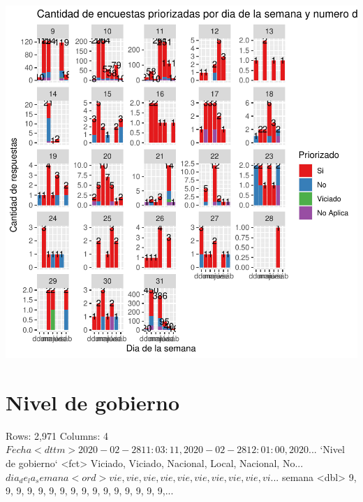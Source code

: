 \documentclass{article}
\begin{document}
\includegraphics{seguimientov5-030}


\section{Nivel de gobierno}

\begin{Schunk}
\begin{Soutput}
Rows: 2,971
Columns: 4
$ Fecha               <dttm> 2020-02-28 11:03:11, 2020-02-28 12:01:00, 2020...
$ `Nivel de gobierno` <fct> Viciado, Viciado, Nacional, Local, Nacional, No...
$ dia_de_la_semana    <ord> vie, vie, vie, vie, vie, vie, vie, vie, vie, vi...
$ semana              <dbl> 9, 9, 9, 9, 9, 9, 9, 9, 9, 9, 9, 9, 9, 9, 9, 9,...
\end{Soutput}
\end{Schunk}
\end{document}
